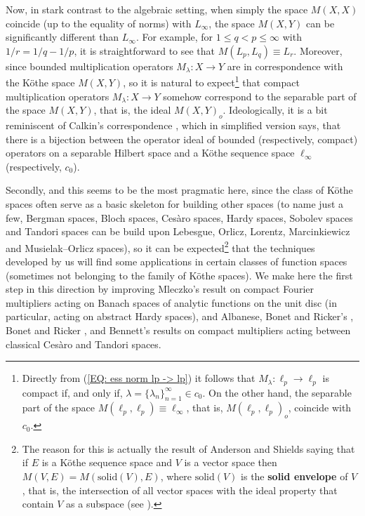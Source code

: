 \documentclass[11pt]{amsart}
\theoremstyle{definition}
\theoremstyle{definition}
\theoremstyle{definition}
\theoremstyle{definition}
\theoremstyle{definition}
\theoremstyle{definition}
\theoremstyle{definition}
\theoremstyle{definition}
\numberwithin{equation}{section}
\numberwithin{equation}{section}
\numberwithin{equation}{section}
\theoremstyle{definition}
\theoremstyle{definition}
\theoremstyle{definition}
\theoremstyle{definition}
\theoremstyle{definition}
\theoremstyle{definition}
\begin{document}
Now, in stark contrast to the algebraic setting, when simply the space $M(X,X)$ coincide (up to the equality of norms) with $L_{\infty}$,
the space $M(X,Y)$ can be significantly different than $L_{\infty}$. For example, for $1 \leqslant q < p \leqslant \infty$ with $1/r = 1/q - 1/p$,
it is straightforward to see that $M(L_p, L_q) \equiv L_r$.
Moreover, since bounded multiplication operators $M_{\lambda} \colon X \rightarrow Y$ are
in correspondence with the K{\" o}the space $M(X,Y)$, so it is natural to expect\footnote{Directly from (\ref{EQ: ess norm lp -> lp}) it follows
that $M_{\lambda} \colon \ell_p \rightarrow \ell_p$ is compact if, and only if, $\lambda = \{\lambda_n\}_{n=1}^{\infty} \in c_0$. On the other hand,
the separable part of the space $M(\ell_p,\ell_p) \equiv \ell_{\infty}$, that is, $M(\ell_p,\ell_p)_o$, coincide with $c_0$.} that compact
multiplication operators $M_{\lambda} \colon X \rightarrow Y$
somehow correspond to the separable part of the space $M(X,Y)$, that is, the ideal $M(X,Y)_o$. Ideologically, it is a bit reminiscent of Calkin's
correspondence \cite{Cal41}, which in simplified version says, that there is a bijection between the operator ideal of bounded (respectively, compact)
operators on a separable Hilbert space and a K{\" o}the sequence space $\ell_{\infty}$ (respectively, $c_0$).

Secondly, and this seems to be the most pragmatic here, since the class of K{\" o}the spaces often serve as a basic skeleton for building other spaces
(to name just a few, Bergman spaces, Bloch spaces, Ces{\` a}ro spaces, Hardy spaces, Sobolev spaces and Tandori spaces can be build upon Lebesgue, Orlicz,
Lorentz, Marcinkiewicz and Musielak--Orlicz spaces), so it can be expected\footnote{The
reason for this is actually the result of Anderson and Shields saying that if $E$ is a K{\" o}the sequence space and $V$ is a vector space then
$M(V,E) = M(\text{solid}(V),E)$, where $\text{solid}(V)$ is the {\bf solid envelope} of $V$, that is, the intersection of all vector spaces
with the ideal property that contain $V$ as a subspace (see \cite[Lemma~2 and Lemma~3(i)]{AS76}).}
that the techniques developed by us will find some applications in certain classes of function spaces (sometimes not belonging to the family of K{\" o}the spaces).
We make here the first step in this direction by improving Mleczko's \cite{Mle09} result on compact Fourier multipliers acting on Banach spaces of
analytic functions on the unit disc (in particular, acting on abstract Hardy spaces), and Albanese, Bonet and Ricker's
\cite{ABR18}, Bonet and Ricker \cite{BR20}, and Bennett's \cite{Ben96} results on compact multipliers acting between classical Ces{\` a}ro and Tandori spaces.
\end{document}
